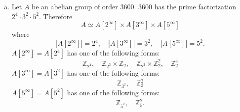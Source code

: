 \documentclass{article}
\begin{document}
\begin{Answer}
\begin{enumerate}[(a)]
  \item{
    Let $A$ be an abelian group of order 3600.
    3600 has the prime factorization $2^4 \cdot 3^2 \cdot
    5^2$. Therefore
    $$
    A \simeq A[2^\infty] \times A[3^\infty] \times A[5^\infty]
    $$
    where
    $$
    |A[2^\infty]| = 2^4, \quad
    |A[3^\infty]| = 3^2, \quad
    |A[5^\infty]| = 5^2.
    $$
    $A[2^\infty] = A[2^4]$ has one of the following forms:
    $$
    \mathbb{Z}_{2^4}, \quad
    \mathbb{Z}_{2^3} \times \mathbb{Z}_{2}, \quad
    \mathbb{Z}_{2^2} \times \mathbb{Z}_{2}^2, \quad
    \mathbb{Z}_{2}^4
    $$
    $A[3^\infty] = A[3^2]$ has one of the following forms:
    $$
    \mathbb{Z}_{3^2}, \quad \mathbb{Z}_{3}^2
    $$
    $A[5^\infty] = A[5^2]$ has one of the following forms:
    $$
    \mathbb{Z}_{5^2}, \quad \mathbb{Z}_{5}^2.
    $$

}
\end{enumerate}
\end{Answer}
\end{document}

